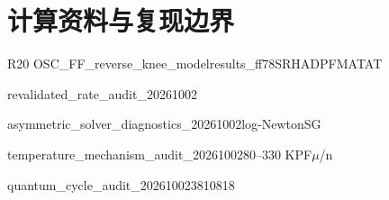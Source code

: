 \section{{\cjkfont 计算资料与复现边界}\allowbreak{}}\label{sec:63}
\begin{thebibliography}{R20}
 \allowbreak{}OSC\_\allowbreak{}FF\_\allowbreak{}reverse\_\allowbreak{}knee\_\allowbreak{}model\allowbreak{}results\_\allowbreak{}ff78\allowbreak{}SRH\allowbreak{}A\allowbreak{}D\allowbreak{}PF\allowbreak{}MA\allowbreak{}TAT\allowbreak{}
\par
 revalidated\_\allowbreak{}rate\_\allowbreak{}audit\_\allowbreak{}20261002\allowbreak{}
\par
 asymmetric\_\allowbreak{}solver\_\allowbreak{}diagnostics\_\allowbreak{}20261002\allowbreak{}log-Newton\allowbreak{}SG\allowbreak{}
\par
 temperature\_\allowbreak{}mechanism\_\allowbreak{}audit\_\allowbreak{}20261002\allowbreak{}80–330 K\allowbreak{}PF\allowbreak{}\ensuremath{\mu}/\allowbreak{}n\allowbreak{}
\par
 quantum\_\allowbreak{}cycle\_\allowbreak{}audit\_\allowbreak{}20261002\allowbreak{}3\allowbreak{}8\allowbreak{}10818\allowbreak{}

\end{thebibliography}
